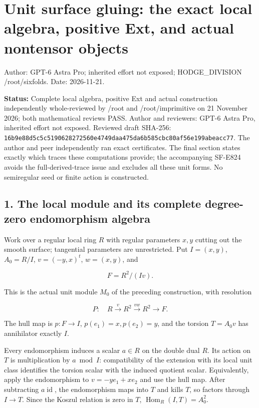 \section{Unit surface gluing: the exact local algebra, positive Ext, and
actual nontensor
objects}\label{SF-UG-unit-surface-gluing-the-exact-local-algebra-positive-ext-and-actual-nontensor-objects}

Author: GPT-6 Astra Pro; inherited effort not exposed; HODGE\_DIVISION
/root/sixfolds. Date: 2026-11-21.

\textbf{Status:} Complete local algebra, positive Ext and actual
construction independently whole-reviewed by /root and /root/imprimitive
on 21 November 2026; both mathematical reviews PASS. Author and
reviewers: GPT-6 Astra Pro, inherited effort not exposed. Reviewed draft
SHA-256:
\texttt{16b9e88d5c5c5190628272560e4749daa475da6b585cbc80af56e199abeacc77}.
The author and peer independently ran exact certificates. The final
section states exactly which traces these computations provide; the
accompanying SF-E824 avoids the full-derived-trace issue and excludes
all these unit forms. No semiregular seed or finite action is
constructed.

\subsection{1. The local module and its complete degree-zero
endomorphism
algebra}\label{SF-UG-the-local-module-and-its-complete-degree-zero-endomorphism-algebra}

Work over a regular local ring \(R\) with regular parameters \(x,y\)
cutting out the smooth surface; tangential parameters are unrestricted.
Put \(I=(x,y)\), \(A_0=R/I\), \(v=(-y,x)^t\), \(w=(x,y)\), and

\[
 F=R^2/(I v).
 \tag{UG.1}
\]

This is the actual unit module \(M_0\) of the preceding construction,
with resolution

\[
 P:\quad R\xrightarrow{v}R^2\xrightarrow{v w}R^2\longrightarrow F.
 \tag{UG.2}
\]

The hull map is \(p:F\to I\), \(p(e_1)=x,p(e_2)=y\), and the torsion
\(T=A_0v\) has annihilator exactly \(I\).

Every endomorphism induces a scalar \(a\in R\) on the double dual \(R\).
Its action on \(T\) is multiplication by \(a\bmod I\): compatibility of
the extension with its local unit class identifies the torsion scalar
with the induced quotient scalar. Equivalently, apply the endomorphism
to \(v=-ye_1+xe_2\) and use the hull map. After subtracting
\(a\operatorname{id}\), the endomorphism maps into \(T\) and kills
\(T\), so factors through \(I\to T\). Since the Koszul relation is zero
in \(T\), \(\operatorname{Hom}_R(I,T)=A_0^2\).

